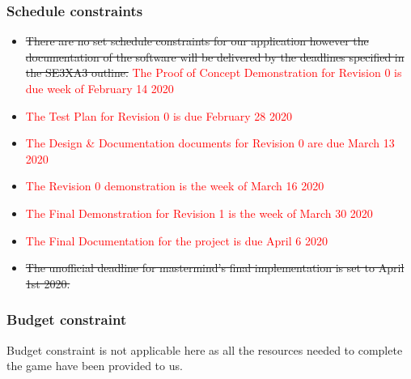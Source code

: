 \documentclass[12pt, titlepage]{article}
\begin{document}
\subsubsection{Schedule constraints}
\begin{itemize}
    \item \sout{There are no set schedule constraints for our application however the documentation of the software will be delivered by the deadlines specified in the SE3XA3 outline.} \textcolor{red}{The Proof of Concept Demonstration for Revision 0 is due week of February 14 2020}
    \item \textcolor{red}{The Test Plan for Revision 0 is due February 28 2020}
    \item \textcolor{red}{The Design \& Documentation documents for Revision 0 are due March 13 2020}
    \item \textcolor{red}{The Revision 0 demonstration is the week of March 16 2020}
    \item \textcolor{red}{The Final Demonstration for Revision 1 is the week of March 30 2020}
    \item \textcolor{red}{The Final Documentation for the project is due April 6 2020}
    \item \sout{The unofficial deadline for mastermind’s final implementation is set to April 1st  2020.}
\end{itemize}

\subsubsection{Budget constraint}
Budget constraint is not applicable here as all the resources needed to complete the game have been provided to us.
\end{document}
